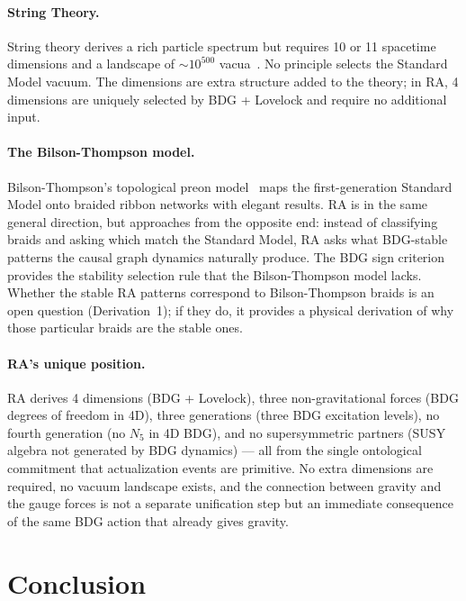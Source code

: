 \documentclass[11pt,a4paper]{article}
\begin{document}
\paragraph{String Theory.} String theory derives a rich particle spectrum but
requires 10 or 11 spacetime dimensions and a landscape of $\sim 10^{500}$
vacua~\citep{Susskind2003}. No principle selects the Standard Model vacuum.
The dimensions are extra structure added to the theory; in RA, 4 dimensions
are uniquely selected by BDG + Lovelock and require no additional input.

\paragraph{The Bilson-Thompson model.} Bilson-Thompson's topological preon
model~\citep{BilsonThompson2005} maps the first-generation Standard Model
onto braided ribbon networks with elegant results. RA is in the same general
direction, but approaches from the opposite end: instead of classifying braids
and asking which match the Standard Model, RA asks what BDG-stable patterns
the causal graph dynamics naturally produce. The BDG sign criterion provides
the stability selection rule that the Bilson-Thompson model lacks. Whether the
stable RA patterns correspond to Bilson-Thompson braids is an open question
(Derivation~1); if they do, it provides a physical derivation of why those
particular braids are the stable ones.

\paragraph{RA's unique position.} RA derives 4 dimensions (BDG + Lovelock),
three non-gravitational forces (BDG degrees of freedom in 4D), three generations
(three BDG excitation levels), no fourth generation (no $N_5$ in 4D BDG), and
no supersymmetric partners (SUSY algebra not generated by BDG dynamics) ---
all from the single ontological commitment that actualization events are
primitive. No extra dimensions are required, no vacuum landscape exists, and
the connection between gravity and the gauge forces is not a separate
unification step but an immediate consequence of the same BDG action that
already gives gravity.

\section{Conclusion}
\label{sec:conclusion}
\end{document}
